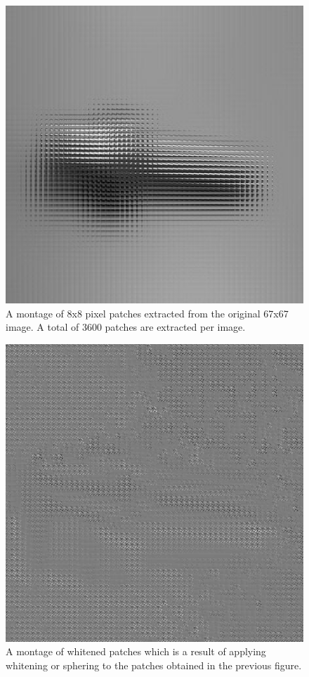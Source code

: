 \documentclass[	DIV=calc,%
				paper=a4,%
				fontsize=11pt,%
				twocolumn]{scrartcl}	 %
\begin{document}
\begin{figure}[H]
    \centering
    \includegraphics[width=0.6\linewidth]{data/sc_data/sc_atwork_patches_montage.jpg}
    \caption{A montage of 8x8 pixel patches extracted from the original 67x67 image. A total of 3600 patches are extracted per image.}
    \label{sc_atwork_patches_montage}
\end{figure}


\begin{figure}[H]
    \centering
    \includegraphics[width=0.6\linewidth]{data/sc_data/sc_atwork_whitened_patches_montage.jpg}
    \caption{A montage of whitened patches which is a result of applying whitening or sphering to the patches obtained in the previous figure.}
    \label{sc_atwork_whitened_patches_montage}
\end{figure}
 
\end{document}
